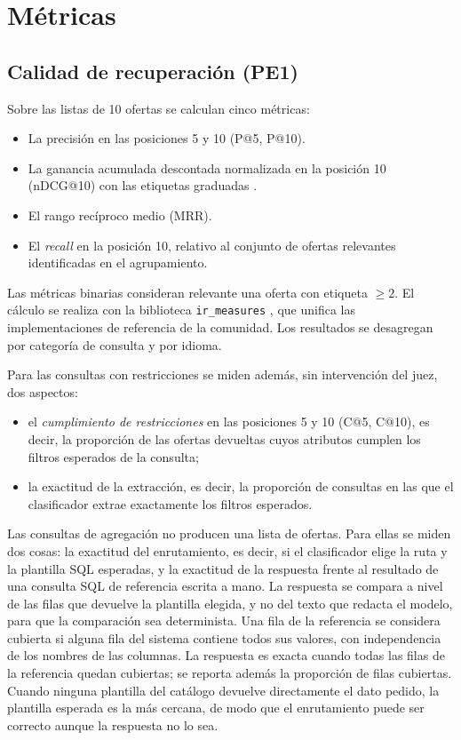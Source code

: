 \section{Métricas}
\label{sec:met-metricas}

\subsection{Calidad de recuperación (PE1)}

Sobre las listas de 10 ofertas se calculan cinco métricas:
\begin{itemize}
    \item La precisión en las posiciones 5 y 10 (P@5, P@10).
    \item La ganancia acumulada descontada normalizada en la posición 10 (nDCG@10) con las etiquetas graduadas \citep{Jarvelin2002}.
    \item El rango recíproco medio (MRR).
    \item El \textit{recall} en la posición 10, relativo al conjunto de ofertas relevantes identificadas en el agrupamiento.
\end{itemize}
Las métricas binarias consideran relevante una oferta con etiqueta $\geq 2$. El cálculo se realiza con la biblioteca \texttt{ir\_measures} \citep{MacAvaney2022}, que unifica las implementaciones de referencia de la comunidad. Los resultados se desagregan por categoría de consulta y por idioma.

Para las consultas con restricciones se miden además, sin intervención del juez, dos aspectos:
\begin{itemize}
    \item el \emph{cumplimiento de restricciones} en las posiciones 5 y 10 (C@5, C@10), es decir, la proporción de las ofertas devueltas cuyos atributos cumplen los filtros esperados de la consulta;
    \item la exactitud de la extracción, es decir, la proporción de consultas en las que el clasificador extrae exactamente los filtros esperados.
\end{itemize}

Las consultas de agregación no producen una lista de ofertas. Para ellas se miden dos cosas: la exactitud del enrutamiento, es decir, si el clasificador elige la ruta y la plantilla SQL esperadas, y la exactitud de la respuesta frente al resultado de una consulta SQL de referencia escrita a mano. La respuesta se compara a nivel de las filas que devuelve la plantilla elegida, y no del texto que redacta el modelo, para que la comparación sea determinista. Una fila de la referencia se considera cubierta si alguna fila del sistema contiene todos sus valores, con independencia de los nombres de las columnas. La respuesta es exacta cuando todas las filas de la referencia quedan cubiertas; se reporta además la proporción de filas cubiertas. Cuando ninguna plantilla del catálogo devuelve directamente el dato pedido, la plantilla esperada es la más cercana, de modo que el enrutamiento puede ser correcto aunque la respuesta no lo sea.

